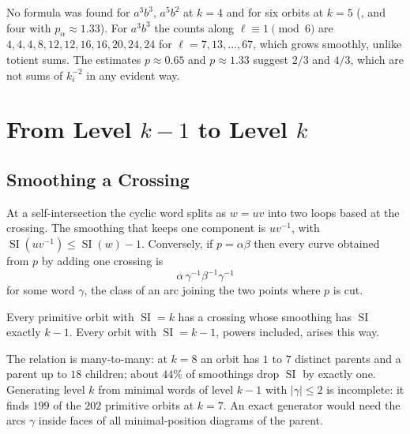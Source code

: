 \documentclass[10pt]{article}
\begin{document}
\begin{rmk}
	No formula was found for $a^3b^3$, $a^5b^2$ at $k = 4$ and for six orbits at $k = 5$ (,  and four with $p_\alpha \approx 1.33$).
	For $a^3 b^3$ the counts along $\ell \equiv 1 \pmod{6}$ are $4, 4, 4, 8, 12, 12, 16, 16, 20, 24, 24$ for $\ell = 7, 13, \ldots, 67$, which grows smoothly, unlike totient sums.
	The estimates $p \approx 0.65$ and $p \approx 1.33$ suggest $2/3$ and $4/3$, which are not sums of $k_i^{-2}$ in any evident way.
\end{rmk}

\section{From Level $k-1$ to Level $k$}

\subsection{Smoothing a Crossing}

At a self-intersection the cyclic word splits as $w = uv$ into two loops based at the crossing.
The smoothing that keeps one component is $u v^{-1}$, with $\operatorname{SI}(u v^{-1}) \leq \operatorname{SI}(w) - 1$.
Conversely, if $p = \alpha\beta$ then every curve obtained from $p$ by adding one crossing is
\[
	\alpha\, \gamma^{-1} \beta^{-1} \gamma^{-1}
\]
for some word $\gamma$, the class of an arc joining the two points where $p$ is cut.

\begin{claim}\label{claim:parent}
	Every primitive orbit with $\operatorname{SI} = k$ has a crossing whose smoothing has $\operatorname{SI}$ exactly $k-1$.
	Every orbit with $\operatorname{SI} = k-1$, powers included, arises this way.
\end{claim}

\begin{rmk}
	The relation is many-to-many: at $k = 8$ an orbit has $1$ to $7$ distinct parents and a parent up to $18$ children; about $44\%$ of smoothings drop $\operatorname{SI}$ by exactly one.
	Generating level $k$ from minimal words of level $k-1$ with $|\gamma| \leq 2$ is incomplete: it finds $199$ of the $202$ primitive orbits at $k = 7$.
	An exact generator would need the arcs $\gamma$ inside faces of all minimal-position diagrams of the parent.
\end{rmk}
\end{document}
